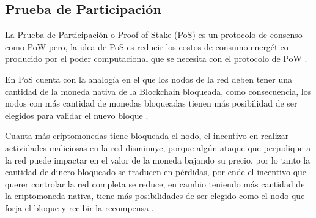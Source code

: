 \subsection{Prueba de Participación }
La Prueba de Participación o Proof of Stake (PoS) es un protocolo de consenso como 
PoW pero, la idea de PoS es reducir los costos de consumo energético  producido por el 
poder computacional que se necesita con el protocolo de PoW \cite[]{vazquez_episodio_2020,brys_cadena_2019}.

En PoS  cuenta con la analogía en el que los nodos de la red deben tener una cantidad
de la moneda nativa de la  Blockchain bloqueada, como consecuencia, los nodos 
con más cantidad de monedas bloqueadas tienen más posibilidad de ser elegidos para validar el nuevo bloque \cite[]{vazquez_episodio_2020,brys_cadena_2019}.
 
Cuanta más \glspl{criptomoneda} tiene bloqueada el nodo, el incentivo en realizar 
actividades maliciosas en la red disminuye, porque algún  ataque que perjudique a  la 
red puede impactar en el valor de la moneda bajando su precio, por lo tanto la cantidad de dinero bloqueado
se traducen en pérdidas, por ende el incentivo que querer controlar la red completa se reduce, 
en cambio teniendo más cantidad de la criptomoneda nativa, tiene más posibilidades
de ser elegido como el nodo que forja el bloque y recibir la recompensa \cite[]{vazquez_episodio_2020,king_ppcoin_2012,academia_que_2018}.
